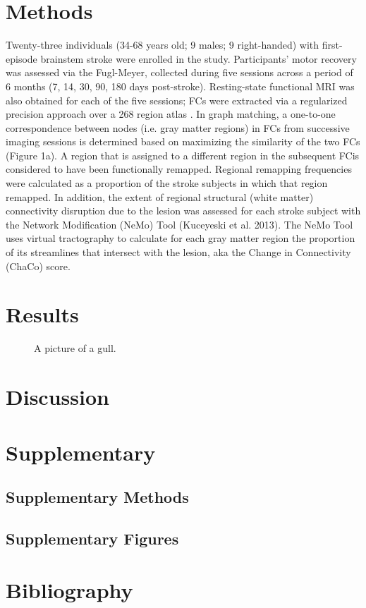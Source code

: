 \documentclass[10pt]{article}
\begin{document}
	\section*{Methods} \label{sec:firstpage}
	
	Twenty-three individuals (34-68 years old;  9 males; 9 right-handed) with first-episode brainstem stroke were enrolled in the study. Participants’ motor recovery was assessed via the Fugl-Meyer, collected during five sessions across a period of 6 months (7, 14, 30, 90, 180 days post-stroke). Resting-state functional MRI was also obtained for each of the five sessions; FCs were extracted via a regularized precision approach \cite{Liegeois2020-ua} over a 268 region atlas \cite{Finn2015-er}. In graph matching, a one-to-one correspondence between nodes (i.e. gray matter regions) in FCs from successive imaging sessions is determined based on maximizing the similarity of the two FCs (Figure 1a). A region that is assigned to a different region in the subsequent FCis considered to have been functionally remapped. Regional remapping frequencies were calculated as a proportion of the stroke subjects in which that region remapped. In addition,  the extent of regional structural (white matter) connectivity disruption due to the lesion was assessed for each stroke subject with the Network Modification (NeMo) Tool (Kuceyeski et al. 2013). The NeMo Tool  uses virtual tractography to calculate for each gray matter region the proportion of its streamlines that intersect with the lesion, aka the Change in Connectivity (ChaCo) score. 
	
	\section*{Results}
	\begin{figure}[h]
		\caption{A picture of a gull.}
		\centering
	\end{figure}
	
	\section*{Discussion}
	
	\section*{Supplementary}
	\subsection*{Supplementary Methods}
	\subsection*{Supplementary Figures}
	
	\section*{Bibliography}

	\printbibliography

	
	
\end{document}
